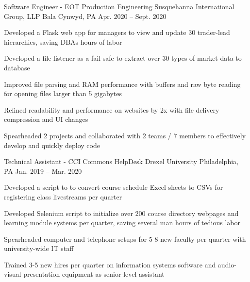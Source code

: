 

\begin{cventries}

  \cventry
  {Software Engineer - EOT Production Engineering} %
  {Susquehanna International Group, LLP} %
  {Bala Cynwyd, PA} %
  {Apr. 2020 -- Sept. 2020} %
  {
    \begin{cvitems} %
      \item {Developed a Flask web app for managers to view and update 30 trader-lead hierarchies, saving DBAs hours of labor}
      \item {Developed a file listener as a fail-safe to extract over 30 types of market data to database}
      \item {Improved file parsing and RAM performance with buffers and raw byte reading for opening files larger than 5 gigabytes}
      \item {Refined readability and performance on websites by 2x with file delivery compression and UI changes}
      \item {Spearheaded 2 projects and collaborated with 2 teams / 7 members to effectively develop and quickly deploy code}
    \end{cvitems}
  }

  \cventry
  {Technical Assistant - CCI Commons HelpDesk} %
  {Drexel University} %
  {Philadelphia, PA} %
  {Jan. 2019 -- Mar. 2020} %
  {
    \begin{cvitems} %
      \item {Developed a script to to convert course schedule Excel sheets to CSVs for registering class livestreams per quarter}
      \item {Developed Selenium script to initialize over 200 course directory webpages and learning module systems per quarter, saving several man hours of tedious labor}
      \item {Spearheaded computer and telephone setups for 5-8 new faculty per quarter with university-wide IT staff}
      \item {Trained 3-5 new hires per quarter on information systems software and audio-visual presentation equipment as senior-level assistant}
    \end{cvitems}
  }

\end{cventries}
